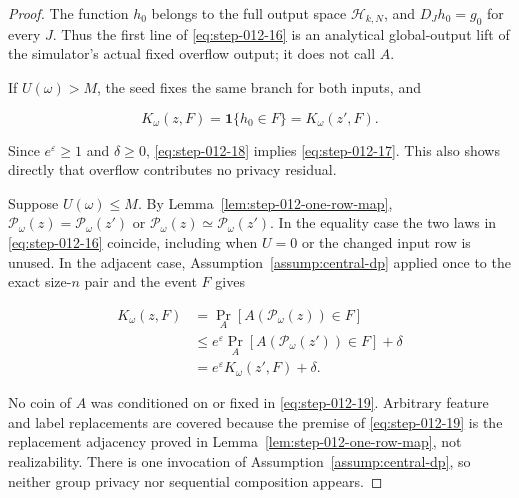 \begin{proof}
The function \(h_0\) belongs to the full output space
\(\mathcal H_{k,N}\), and \(D_Jh_0=g_0\) for every \(J\).  Thus the first
line of \eqref{eq:step-012-16} is an analytical global-output lift of the simulator's actual
fixed overflow output; it does not call \(A\).

If \(U(\omega)>M\), the seed fixes the same branch for both inputs, and

\[
  K_\omega(z,F)=\mathbf1\{h_0\in F\}=K_\omega(z',F).
\tag{S12.18}\label{eq:step-012-18}
\]

Since \(e^\varepsilon\ge1\) and \(\delta\ge0\), \eqref{eq:step-012-18} implies \eqref{eq:step-012-17}.  This
also shows directly that overflow contributes no privacy residual.

Suppose \(U(\omega)\le M\).  By
Lemma~\ref{lem:step-012-one-row-map},
\(\mathcal P_\omega(z)=\mathcal P_\omega(z')\) or
\(\mathcal P_\omega(z)\simeq\mathcal P_\omega(z')\).  In the equality
case the two laws in \eqref{eq:step-012-16} coincide, including when \(U=0\) or the changed
input row is unused.  In the adjacent case, Assumption~\ref{assump:central-dp}
applied once to the exact size-\(n\) pair and the event \(F\) gives

\[
\begin{aligned}
  K_\omega(z,F)
  &=\Pr_A[A(\mathcal P_\omega(z))\in F]\\
  &\le e^\varepsilon
    \Pr_A[A(\mathcal P_\omega(z'))\in F]+\delta\\
  &=e^\varepsilon K_\omega(z',F)+\delta.
\end{aligned}
\tag{S12.19}\label{eq:step-012-19}
\]

No coin of \(A\) was conditioned on or fixed in \eqref{eq:step-012-19}.  Arbitrary feature
and label replacements are covered because the premise of \eqref{eq:step-012-19} is the
replacement adjacency proved in Lemma~\ref{lem:step-012-one-row-map}, not
realizability.  There is one invocation of
Assumption~\ref{assump:central-dp}, so neither group privacy
nor sequential composition appears. \end{proof}

